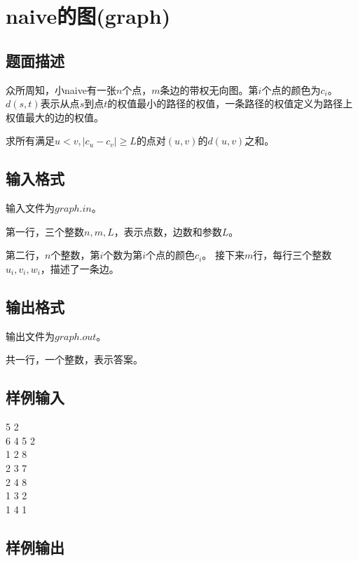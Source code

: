 \documentclass{ctexart}
\begin{document}
\newpage

\section{naive的图(graph)}

\subsection{题面描述}

众所周知，小naive有一张$n$个点，$m$条边的带权无向图。第$i$个点的颜色为$c_i$。$d(s, t)$表示从点$s$到点$t$的权值最小的路径的权值，一条路径的权值定义为路径上权值最大的边的权值。 \par
求所有满足$u < v, |c_u - c_v| \ge L$的点对$(u, v)$的$d(u, v)$之和。 \par

\subsection{输入格式}

输入文件为$graph.in$。 \par
第一行，三个整数$n, m, L$，表示点数，边数和参数$L$。 \par
第二行，$n$个整数，第$i$个数为第$i$个点的颜色$c_i$。
接下来$m$行，每行三个整数$u_i, v_i, w_i$，描述了一条边。 \par

\subsection{输出格式}

输出文件为$graph.out$。 \par
共一行，一个整数，表示答案。 \par

\subsection{样例输入}

 5 2 \\
6 4 5 2 \\
1 2 8 \\
2 3 7 \\
2 4 8 \\
1 3 2 \\
1 4 1 \\


\subsection{样例输出}
\end{document}
